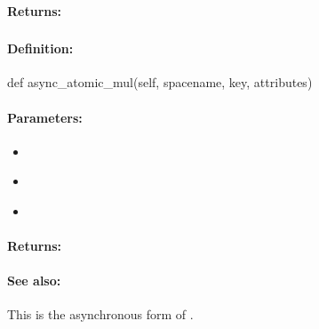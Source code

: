 \paragraph{Returns:}


\pagebreak
\subsubsection{}
\label{api:python:async_atomic_mul}


\paragraph{Definition:}
\begin{pythoncode}
def async_atomic_mul(self, spacename, key, attributes)
\end{pythoncode}

\paragraph{Parameters:}
\begin{itemize}[noitemsep]
\item {}\\

\item {}\\

\item {}\\

\end{itemize}

\paragraph{Returns:}


\paragraph{See also:}  This is the asynchronous form of .

\pagebreak
\subsubsection{}
\label{api:python:cond_atomic_mul}



